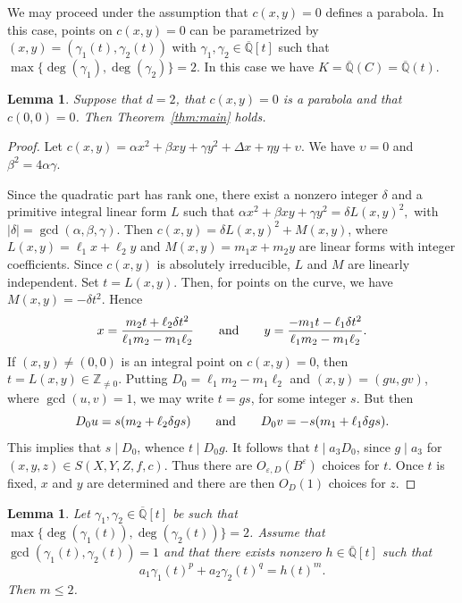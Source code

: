 \documentclass[a4paper,11pt,twoside,reqno]{amsart}
\newtheorem{lemma}[theorem]{Lemma}
\theoremstyle{definition}
\theoremstyle{remark}
\numberwithin{equation}{section}
\newcommand\ve{\varepsilon}
\newcommand\Z{\mathbb{Z}}
\newcommand\K{\overline{\mathbb{Q}}}
\newcommand\1{\mathbf{1}}
\renewcommand{\leq}{\leqslant}
\begin{document}
We may proceed under the assumption that $c(x,y)=0$ defines a parabola. In this case, points on $c(x,y)=0$ can be parametrized by $(x,y)=(\gamma_1(t),\gamma_2(t))$ with $\gamma_1,\gamma_2\in\K[t]$ such that $\max\{\deg(\gamma_1),\deg(\gamma_2)\}=2$. 
In this case we have $K=\K(C)=\K(t)$.

\begin{lemma}\label{lem:c00}
Suppose that $d=2$, that $c(x,y)=0$ is a parabola and that $c(0,0)=0$. Then Theorem~\ref{thm:main} holds.
\end{lemma}
\begin{proof}
	Let $c(x,y)=\alpha x^2+\beta xy+\gamma y^2+\Delta x+\eta y+\upsilon$. We have $\upsilon=0$ and $\beta^2=4\alpha \gamma$.
	
	Since the quadratic part has rank one, there exist a nonzero
integer $\delta$ and a primitive integral linear form $L$ such
that
$
\alpha x^2+\beta xy+\gamma y^2=\delta L(x,y)^2,
$
with $|\delta|=\gcd(\alpha,\beta,\gamma)$.	
Then $c(x,y)=\delta L(x,y)^2+M(x,y)$, where $L(x,y)=\ell_1 x+\ell_2 y$ and $M(x,y)=m_1 x+m_2 y$ are linear forms with integer coefficients. Since $c(x,y)$ is absolutely irreducible, $L$ and $M$ are linearly independent. Set $t=L(x,y)$. Then, for points on the curve, we have $M(x,y)=-\delta t^2$. Hence
 \[
 x=\frac{m_2 t+\ell_2\delta t^2}{\ell_1m_2-m_1\ell_2} \hspace{20 pt} \text{and} \hspace{20 pt} y=\frac{-m_1 t-\ell_1\delta t^2}{\ell_1m_2-m_1\ell_2}.
 \]
 If $(x,y)\neq (0,0)$ is an integral point on $c(x,y)=0$, then $t=L(x,y)\in \Z_{\neq 0}$.
	Putting $D_0=\ell_1m_2-m_1\ell_2$ and $(x,y)=(gu,gv)$, where $\gcd(u,v)=1$, we 
may write $t=gs$, for some integer $s$. But then 
\[
D_0u=s(m_2+\ell_2\delta gs) \hspace{20 pt} \text{and} \hspace{20 pt}
D_0v=-s(m_1+\ell_1\delta gs).
\]
This implies that $s\mid D_0$, whence $t\mid D_0g$. It follows that $t\mid a_3D_0$, since $g\mid a_3$ for $(x,y,z)\in S(X,Y,Z,f,c)$.
Thus there are $O_{\ve,D}(B^{\ve})$ choices for $t$. Once $t$ is fixed, $x$ and $y$ are determined and there are then $O_D(1)$ choices for $z$.
\end{proof}

\begin{lemma}\label{lem:irrsquare}
 Let $\gamma_1,\gamma_2\in\K[t]$ be such that $\max\{\deg(\gamma_1(t)),\deg(\gamma_2(t))\}=2$. Assume that $\gcd(\gamma_1(t),\gamma_2(t))=1$ and that there exists nonzero $h\in \K[t]$ such that \[
 a_1\gamma_1(t)^p+a_2\gamma_2(t)^q=h(t)^m. 
 \]
 Then $m\leq 2$.
\end{lemma}
\end{document}
